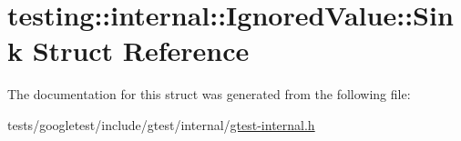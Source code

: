 \hypertarget{structtesting_1_1internal_1_1IgnoredValue_1_1Sink}{}\section{testing\+:\+:internal\+:\+:Ignored\+Value\+:\+:Sink Struct Reference}
\label{structtesting_1_1internal_1_1IgnoredValue_1_1Sink}


The documentation for this struct was generated from the following file\+:\begin{DoxyCompactItemize}
\item 
tests/googletest/include/gtest/internal/\hyperlink{gtest-internal_8h}{gtest-\/internal.\+h}\end{DoxyCompactItemize}

